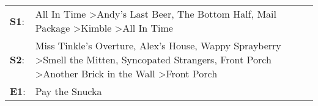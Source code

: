 \begin{supertabular}{p{0.03\textwidth}p{0.92\textwidth}}
 \textbf{S1}:  &                                                                                                                          All In Time\textsuperscript{} \textgreater \enspace Andy's Last Beer\textsuperscript{}, \enspace The Bottom Half\textsuperscript{}, \enspace Mail Package\textsuperscript{} \textgreater \enspace Kimble\textsuperscript{} \textgreater \enspace All In Time\textsuperscript{}  \enspace  \\
 \textbf{S2}:  &  Miss Tinkle's Overture\textsuperscript{}, \enspace Alex's House\textsuperscript{}, \enspace Wappy Sprayberry\textsuperscript{} \textgreater \enspace Smell the Mitten\textsuperscript{}, \enspace Syncopated Strangers\textsuperscript{}, \enspace Front Porch\textsuperscript{} \textgreater \enspace Another Brick in the Wall\textsuperscript{} \textgreater \enspace Front Porch\textsuperscript{}  \enspace  \\
 \textbf{E1}:  &                                                                                                                                                                                                                                                                                                                                                                        Pay the Snucka\textsuperscript{}  \enspace  \\
\end{supertabular}
